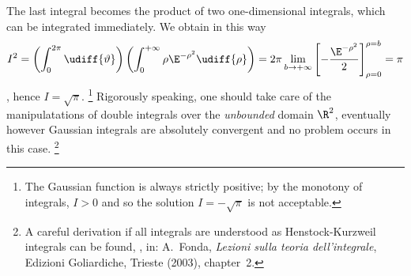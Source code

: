 The last integral becomes the product of two one-dimensional
integrals, which can be integrated immediately. We obtain in this way 
\begin{dmath*}[compact]
I^{2} = \left( \int_{0}^{2\pi} \udiff{\vartheta} \right) \left(
\int_{0}^{+\infty} \rho \E^{-\rho^{2}} \udiff{\rho} \right) = 2\pi
\lim_{b\rightarrow+\infty} \left[
-\frac{\E^{-\rho^{2}}}{2} \right]_{\rho = 0}^{\rho = b} = \pi 
\end{dmath*},
hence $I = \sqrt{\pi}$.%
\footnote{The Gaussian function is always strictly positive; by the monotony of
   integrals, $I>0$ and so the solution
   $I=-\sqrt{\pi}$ is not acceptable.}
Rigorously speaking, one should take care of the
manipulatations of double integrals over the \emph{unbounded} domain $\R^{2}$, 
eventually 
however Gaussian integrals are absolutely convergent and 
no
problem occurs in this case.%
\footnote{A careful derivation if all integrals are understood as Henstock-Kurzweil
integrals can be found, \eg, in: A.~Fonda,
\emph{Lezioni sulla teoria dell'integrale}, Edizioni Goliardiche, Trieste
(2003), chapter~2.}


